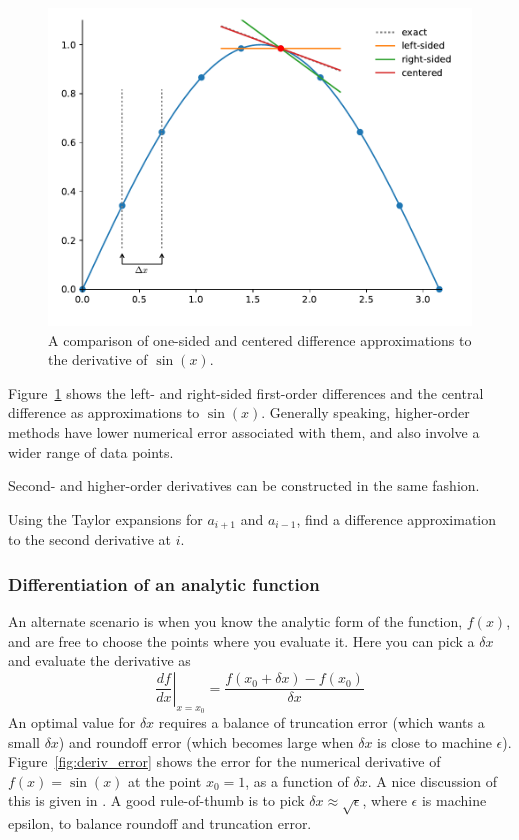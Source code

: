 \begin{figure}[t]
\centering
\includegraphics[width=0.8\linewidth]{derivs}
\caption[Difference approximations to the derivative of $\sin(x)$]
        {\label{fig:derivs} A comparison of one-sided and centered
          difference approximations to the derivative of $\sin(x)$.}
\end{figure}

Figure~\ref{fig:derivs} shows the left- and right-sided first-order
differences and the central difference as approximations to
$\sin(x)$. Generally speaking, higher-order methods have lower
numerical error associated with them, and also involve a wider range
of data points.

Second- and higher-order derivatives can be constructed in the same fashion.

\begin{exercise}
{Using the Taylor expansions for $a_{i+1}$ and $a_{i-1}$, find a difference
approximation to the second derivative at $i$.}
\end{exercise}

\subsubsection{Differentiation of an analytic function}

An alternate scenario is when you know the analytic form of the
function, $f(x)$, and are free to choose the points where you evaluate
it.  Here you can pick a $\delta x$ and evaluate the derivative as
\begin{equation}
\left . \frac{df}{dx} \right |_{x=x_0} =  \frac{f(x_0+\delta x) - f(x_0)}{\delta x}
\end{equation}
An optimal value for $\delta x$ requires a balance of truncation error
(which wants a small $\delta x$) and roundoff error (which becomes
large when $\delta x$ is close to machine $\epsilon$).
Figure~\ref{fig:deriv_error} shows the error for the numerical
derivative of $f(x) = \sin(x)$ at the point $x_0 = 1$, as a function
of $\delta x$.  A nice discussion of this is given in \cite{yak}.  A
good rule-of-thumb is to pick $\delta x \approx \sqrt{\epsilon}$,
where $\epsilon$ is machine epsilon, to balance roundoff and
truncation error.

